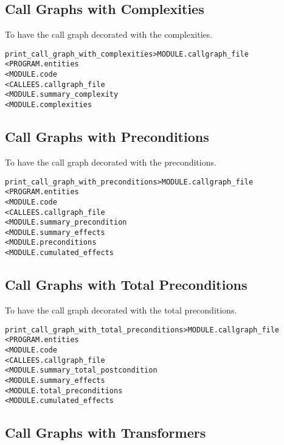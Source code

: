 \documentclass[a4paper]{report}
\newenvironment{PipsMake}{\begin{alltt}}{\end{alltt}}
\begin{document}
\subsection{Call Graphs with Complexities}

To have the call graph decorated with the complexities.
\begin{PipsMake}
print_call_graph_with_complexities     > MODULE.callgraph_file
        < PROGRAM.entities
        < MODULE.code
        < CALLEES.callgraph_file
        < MODULE.summary_complexity
        < MODULE.complexities
\end{PipsMake}

\subsection{Call Graphs with Preconditions}

To have the call graph decorated with the preconditions.
\begin{PipsMake}
print_call_graph_with_preconditions      > MODULE.callgraph_file
        < PROGRAM.entities
        < MODULE.code
        < CALLEES.callgraph_file
        < MODULE.summary_precondition
        < MODULE.summary_effects
        < MODULE.preconditions
        < MODULE.cumulated_effects
\end{PipsMake}

\subsection{Call Graphs with Total Preconditions}

To have the call graph decorated with the total preconditions.
\begin{PipsMake}
print_call_graph_with_total_preconditions      > MODULE.callgraph_file
        < PROGRAM.entities
        < MODULE.code
        < CALLEES.callgraph_file
        < MODULE.summary_total_postcondition
        < MODULE.summary_effects
        < MODULE.total_preconditions
        < MODULE.cumulated_effects
\end{PipsMake}

\subsection{Call Graphs with Transformers}
\end{document}
